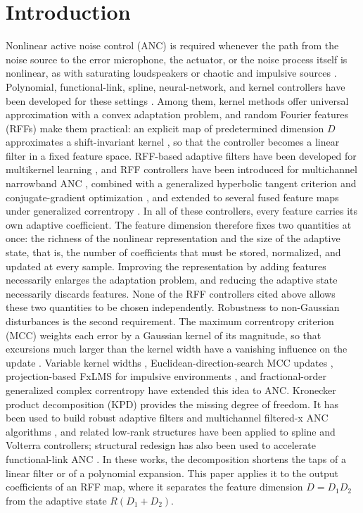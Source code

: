 \documentclass[preprint,12pt]{elsarticle}
\begin{document}
\section{Introduction}
Nonlinear active noise control (ANC) is required whenever the path from the noise source to the error microphone, the actuator, or the noise process itself is nonlinear, as with saturating loudspeakers or chaotic and impulsive sources \cite{ref1}. Polynomial, functional-link, spline, neural-network, and kernel controllers have been developed for these settings \cite{ref1}. Among them, kernel methods offer universal approximation with a convex adaptation problem, and random Fourier features (RFFs) make them practical: an explicit map of predetermined dimension $D$ approximates a shift-invariant kernel \cite{ref2}, so that the controller becomes a linear filter in a fixed feature space. RFF-based adaptive filters have been developed for multikernel learning \cite{ref3}, and RFF controllers have been introduced for multichannel narrowband ANC \cite{ref4}, combined with a generalized hyperbolic tangent criterion and conjugate-gradient optimization \cite{ref10}, and extended to several fused feature maps under generalized correntropy \cite{ref11}.
In all of these controllers, every feature carries its own adaptive coefficient. The feature dimension therefore fixes two quantities at once: the richness of the nonlinear representation and the size of the adaptive state, that is, the number of coefficients that must be stored, normalized, and updated at every sample. Improving the representation by adding features necessarily enlarges the adaptation problem, and reducing the adaptive state necessarily discards features. None of the RFF controllers cited above allows these two quantities to be chosen independently.
Robustness to non-Gaussian disturbances is the second requirement. The maximum correntropy criterion (MCC) weights each error by a Gaussian kernel of its magnitude, so that excursions much larger than the kernel width have a vanishing influence on the update \cite{ref5}. Variable kernel widths \cite{ref6}, Euclidean-direction-search MCC updates \cite{ref7}, projection-based FxLMS for impulsive environments \cite{ref8}, and fractional-order generalized complex correntropy \cite{ref9} have extended this idea to ANC.
Kronecker product decomposition (KPD) provides the missing degree of freedom. It has been used to build robust adaptive filters \cite{ref15} and multichannel filtered-x ANC algorithms \cite{ref16,ref17}, and related low-rank structures have been applied to spline \cite{ref13} and Volterra \cite{ref14} controllers; structural redesign has also been used to accelerate functional-link ANC \cite{ref12}. In these works, the decomposition shortens the taps of a linear filter or of a polynomial expansion. This paper applies it to the output coefficients of an RFF map, where it separates the feature dimension $D = D_1 D_2$ from the adaptive state $R(D_1 + D_2)$.
\end{document}
